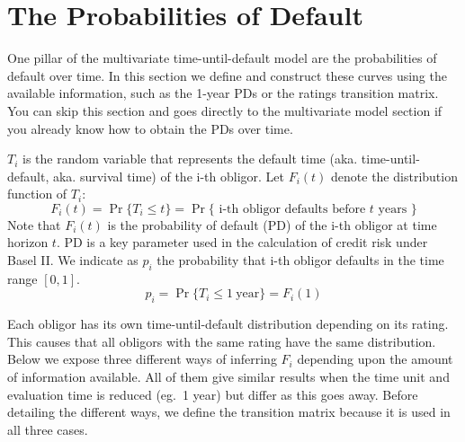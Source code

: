 \documentclass[11pt,fleqn]{book} %
\begin{document}
\section{The Probabilities of Default}
\label{sec:pd}

One pillar of the multivariate time-until-default model are the probabilities 
of default over time. In this section we define and construct these curves 
using the available information, such as the 1-year PDs or the ratings 
transition matrix. You can skip this section and goes directly to the 
multivariate model section if you already know how to obtain the PDs over 
time.

\begin{definition}
	$T_i$ is the random variable that represents the default time (aka. 
	time-until-default, aka. survival time) of the i-th obligor. Let $F_i(t)$
	denote the distribution function of $T_i$:
	\begin{displaymath}
		F_i(t) = \Pr\{T_i \le t\} = 
		\Pr\{\text{ i-th obligor defaults before $t$ years }\}
	\end{displaymath}
	Note that $F_i(t)$ is the probability of default (PD) of the i-th obligor
	at time horizon $t$. PD is a key parameter used in the calculation of credit 
	risk under Basel II. We indicate as $p_i$ the probability that i-th obligor 
	defaults in the time range $[0,1]$.
	\begin{displaymath}
		p_i = \Pr\{T_i \le 1\ \text{year}\} = F_i(1) 
	\end{displaymath}
\end{definition}

Each obligor has its own time-until-default distribution depending on its 
rating. This causes that all obligors with the same rating have the same 
distribution. Below we expose three different ways of inferring $F_i$ 
depending upon the amount of information available. All of them give similar 
results when the time unit and evaluation time is reduced (eg.\ 1 year) but 
differ as this goes away. Before detailing the different ways, we define the 
transition matrix because it is used in all three cases.
\end{document}
